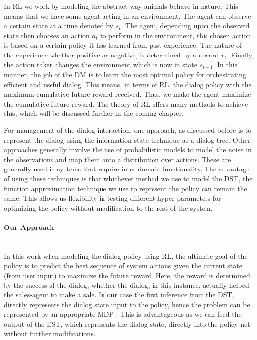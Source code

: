 \documentclass[14pt]{extarticle}
\newcommand{\myparagraph}[1]{\paragraph{#1}\mbox{}\\ \linebreak}
\numberwithin{equation}{section}
\begin{document}
	In RL we work by modeling the abstract way animals behave in nature. This means that we have some agent acting in an environment. The agent can observe a certain state at a time denoted by $s_t$. The agent, depending upon the observed state then chooses an action $a_t$ to perform in the environment, this chosen action is based on a certain policy it has learned from past experience. The nature of the experience whether positive or negative, is determined by a reward $r_t$. Finally, the action taken changes the environment which is now in state $s_{t+1}$. In this manner, the job of the DM is to learn the most optimal policy for orchestrating efficient and useful dialog. This means, in terms of RL, the dialog policy with the maximum cumulative future reward received. Thus, we make the agent maximize the cumulative future reward. The theory of RL \cite{Sutton-introRL} offers many methods to achieve this\cite{DBLP:journals/corr/abs-1711-01731}, which will be discussed further in the coming chapter. \par
	For management of the dialog interaction, one approach, as discussed before is to represent the dialog using the information state technique as a dialog tree. Other approaches generally involve the use of probabilistic models to model the noise in the observations and map them onto a distribution over actions. These are generally used in systems that require inter-domain functionality\cite{henderson_interdomain}. The advantage of using these techniques is that whichever method we use to model the DST, the function approximation technique we use to represent the policy can remain the same. This allows us flexibility in testing different hyper-parameters for optimizing the policy without modification to the rest of the system.
	\myparagraph{Our Approach}
	In this work when modeling the dialog policy using RL, the ultimate goal of the policy is to predict the best sequence of system actions given the current  state (from user input) to maximize the future reward.
	Here, the reward is determined by the success of the dialog, whether the dialog, in this instance, actually helped the sales-agent to make a sale. In our case the first inference from the DST, directly represents the dialog state input to the policy, hence the problem can be represented by an appropriate MDP \cite{mdp-pieraccini}. This is advantageous as we can feed the output of the DST, which represents the dialog state, directly into the policy net without further modifications.
\end{document}
